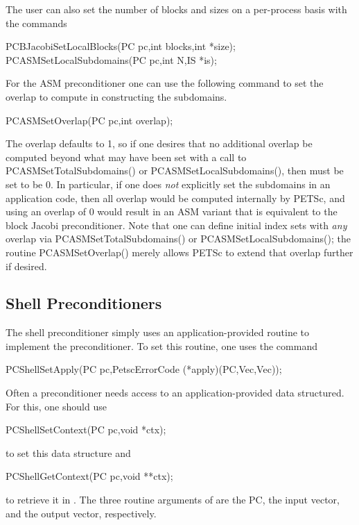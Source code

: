 The user can also set the number of blocks and sizes on a per-process
basis with the commands
\begin{tabbing}
  PCBJacobiSetLocalBlocks(PC pc,int blocks,int *size);\\
  PCASMSetLocalSubdomains(PC pc,int N,IS *is);
\end{tabbing}

For the ASM preconditioner one can use the following command to set
the overlap to compute in constructing the subdomains.
\begin{tabbing}
  PCASMSetOverlap(PC pc,int overlap);
\end{tabbing}
The overlap defaults to 1, so if one desires that no additional
overlap be computed beyond what may have been set with a call to PCASMSetTotalSubdomains() or PCASMSetLocalSubdomains(), then
 must be set to be 0.  In particular, if one does {\em
not} explicitly set the subdomains in an application code, then all
overlap would be computed internally by PETSc, and using an overlap of
0 would result in an ASM variant that is equivalent to the block
Jacobi preconditioner.  Note that one can define initial index sets
 with {\em any} overlap via PCASMSetTotalSubdomains() or
PCASMSetLocalSubdomains(); the routine PCASMSetOverlap()
merely allows PETSc to extend that overlap further if desired.

\subsection{Shell Preconditioners}

The shell preconditioner simply uses an application-provided routine to 
implement the preconditioner. To set this routine, one uses the 
command 
\begin{tabbing}
  PCShellSetApply(PC pc,PetscErrorCode (*apply)(PC,Vec,Vec));
\end{tabbing}
Often a preconditioner needs access to an application-provided data
structured.  For this, one should use
\begin{tabbing}
  PCShellSetContext(PC pc,void *ctx);
\end{tabbing}
to set this data structure and
\begin{tabbing}
  PCShellGetContext(PC pc,void **ctx);
\end{tabbing}
to retrieve it in .  The three routine arguments of
 are the PC, the input vector, and the output vector,
respectively.

